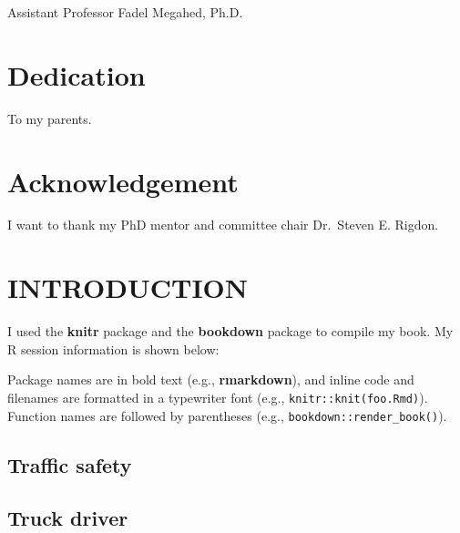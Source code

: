 \documentclass[12pt]{book}
\numberwithin{equation}{chapter}
\begin{document}
\vspace{.3cm}
Assistant Professor Fadel Megahed, Ph.D.
\vspace*{\fill}








\hypertarget{dedication}{%
\chapter*{Dedication}\label{dedication}}

To my parents.

\hypertarget{acknowledgement}{%
\chapter*{Acknowledgement}\label{acknowledgement}}

I want to thank my PhD mentor and committee chair Dr.~Steven E. Rigdon.

\cleardoublepage
\tableofcontents

\listoffigures
\listoftables

\mainmatter

\doublespacing

\hypertarget{introduction}{%
\chapter{INTRODUCTION}\label{introduction}}

I used the \textbf{knitr} package and the \textbf{bookdown} package to compile my book. My R session information is shown below:

Package names are in bold text (e.g., \textbf{rmarkdown}), and inline code and filenames are formatted in a typewriter font (e.g., \texttt{knitr::knit(\textquotesingle{}foo.Rmd\textquotesingle{})}). Function names are followed by parentheses (e.g., \texttt{bookdown::render\_book()}).

\hypertarget{traffic-safety}{%
\section{Traffic safety}\label{traffic-safety}}

\hypertarget{truck-driver}{%
\section{Truck driver}\label{truck-driver}}
\end{document}

